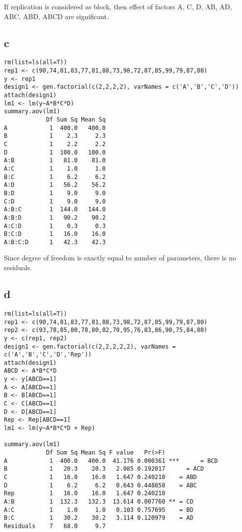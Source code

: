 \documentclass[11pt,letterpaper]{article}
\begin{document}
\noindent If replication is considered as block, then effect of factors A, C, D, AB, AD, ABC, ABD, ABCD are significant. 

\subsection*{c}
\begin{verbatim}
rm(list=ls(all=T))
rep1 <- c(90,74,81,83,77,81,88,73,98,72,87,85,99,79,87,80)
y <- rep1
design1 <- gen.factorial(c(2,2,2,2), varNames = c('A','B','C','D'))
attach(design1)
lm1 <- lm(y~A*B*C*D)
summary.aov(lm1)
            Df Sum Sq Mean Sq
A            1  400.0   400.0
B            1    2.3     2.3
C            1    2.2     2.2
D            1  100.0   100.0
A:B          1   81.0    81.0
A:C          1    1.0     1.0
B:C          1    6.2     6.2
A:D          1   56.2    56.2
B:D          1    9.0     9.0
C:D          1    9.0     9.0
A:B:C        1  144.0   144.0
A:B:D        1   90.2    90.2
A:C:D        1    0.3     0.3
B:C:D        1   16.0    16.0
A:B:C:D      1   42.3    42.3
\end{verbatim}

\noindent Since degree of freedom is exactly equal to number of parameters, there is no residuals. 

\subsection*{d}
\begin{verbatim}
rm(list=ls(all=T))
rep1 <- c(90,74,81,83,77,81,88,73,98,72,87,85,99,79,87,80)
rep2 <- c(93,78,85,80,78,80,82,70,95,76,83,86,90,75,84,80)
y <- c(rep1, rep2)
design1 <- gen.factorial(c(2,2,2,2,2), varNames = c('A','B','C','D','Rep'))
attach(design1)
ABCD <- A*B*C*D
y <- y[ABCD==1]
A <- A[ABCD==1]
B <- B[ABCD==1]
C <- C[ABCD==1]
D <- D[ABCD==1]
Rep <- Rep[ABCD==1]
lm1 <- lm(y~A*B*C*D + Rep)

summary.aov(lm1)
            Df Sum Sq Mean Sq F value   Pr(>F)    
A            1  400.0   400.0  41.176 0.000361 ***		= BCD
B            1   20.3    20.3   2.085 0.192017    	= ACD
C            1   16.0    16.0   1.647 0.240210    = ABD
D            1    6.2     6.2   0.643 0.448858    = ABC
Rep          1   16.0    16.0   1.647 0.240210    
A:B          1  132.3   132.3  13.614 0.007760 ** = CD
A:C          1    1.0     1.0   0.103 0.757695    = BD
B:C          1   30.2    30.2   3.114 0.120979    = AD
Residuals    7   68.0     9.7            
\end{verbatim}
\end{document}
